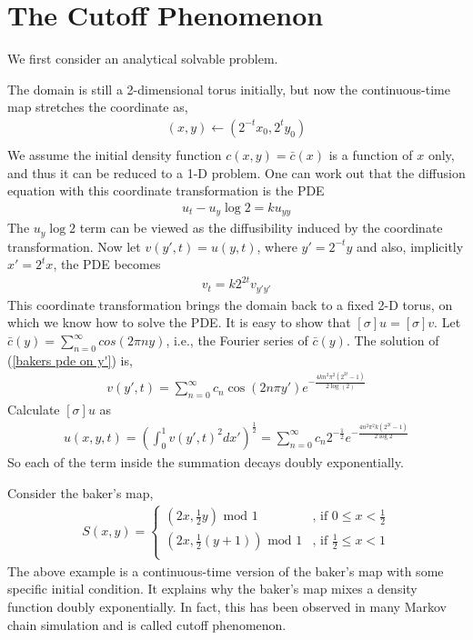 \section{The Cutoff Phenomenon}
We first consider an analytical solvable problem.
\begin{example}

The domain is still a 2-dimensional torus initially, but now the
continuous-time map stretches the coordinate as,
  \begin{eqnarray*}
     (x,y) \leftarrow (2^{-t}x_0,2^{t}y_0)\\
  \end{eqnarray*}
We assume the initial density function $c(x,y) = \bar{c}(x)$ is a
function of $x$ only, and thus it can be reduced to a 1-D problem.
One can work out that the diffusion equation with this coordinate
transformation is the PDE
  \begin{eqnarray*}
     u_t - u_y\log{2}  = k u_{yy}
  \end{eqnarray*}
The $u_y\log{2}$ term can be viewed as the diffusibility induced by
the coordinate transformation. Now let $v(y',t) = u(y,t)$, where $y'
= 2^{-t}y$ and also, implicitly $x' = 2^{t}x $, the PDE becomes
  \begin{eqnarray}
  \label{bakers pde on y'}
     v_t  = k 2^{2t} v_{y'y'}
  \end{eqnarray}
This coordinate transformation brings the domain back to a fixed 2-D
torus, on which we know how to solve the PDE. It is easy to show
that $[\sigma]u = [\sigma]v $. Let $\bar{c}(y) = \sum_{n=0}^\infty
cos(2 \pi n y) $, i.e., the Fourier series of $\bar{c}(y)$. The
solution of (\ref{bakers pde on y'}) is,
  \begin{eqnarray*}
     v(y',t) =  \sum_{n=0}^\infty c_n \cos (2 n \pi  y') e^{-\frac{4 k n^2 \pi^2 (2^{2 t}-1)}{2\log (2)}}
  \end{eqnarray*}
Calculate $[\sigma]u$ as
\begin{eqnarray*}
 [\sigma]u(x,y,t) = \left(\int_{0}^{1} v(y',t)^2 dx'\right)^{\frac{1}{2}} = \sum_{n=0}^\infty c_n 2^{-\frac{1}{2}} e^{-\frac{4 n^2 \pi^2 k (2^{2t}-1)}{2\log2} }
\end{eqnarray*}
So each of the term inside the summation decays doubly exponentially.

\end{example}

Consider the baker's map,
  \begin{eqnarray}
    S(x,y) =  \left\{ \begin{array}{cc}
                 (2x,\frac{1}{2}y) \mbox{ mod } 1      &\mbox{, if } 0\le x < \frac{1}{2} \\
                 (2x,\frac{1}{2}(y+1)) \mbox{ mod } 1  &\mbox{, if } \frac{1}{2}\le x< 1\\
              \end{array} \right.
  \end{eqnarray}
The above example is a continuous-time version of the baker's map with some specific initial condition. It explains why the baker's map mixes a density function doubly exponentially. In fact, this has been observed in many Markov chain simulation and is called cutoff phenomenon.


